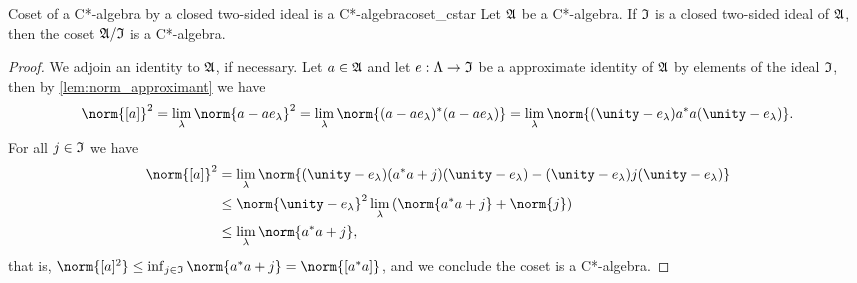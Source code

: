 \begin{theorem}{Coset of a C*-algebra by a closed two-sided ideal is a C*-algebra}{coset_cstar}
    Let \(\mathfrak{A}\) be a C*-algebra. If \(\mathfrak{I}\) is a closed two-sided ideal of \(\mathfrak{A}\), then the coset \(\mathfrak{A}/\mathfrak{I}\) is a C*-algebra.
\end{theorem}
\begin{proof}
    We adjoin an identity to \(\mathfrak{A}\), if necessary. Let \(a \in \mathfrak{A}\) and let \(e : \Lambda \to \mathfrak{I}\) be a approximate identity of \(\mathfrak{A}\) by elements of the ideal \(\mathfrak{I}\), then by \cref{lem:norm_approximant} we have
    \begin{equation*}
        \norm{[a]}^2 = \lim_{\lambda}{\norm{a - ae_{\lambda}}^2} = \lim_{\lambda}{\norm{(a - ae_{\lambda})^*(a - ae_{\lambda})}} = \lim_{\lambda}{\norm{(\unity - e_{\lambda})a^*a(\unity - e_{\lambda})}}.
    \end{equation*}
    For all \(j \in \mathfrak{I}\) we have
    \begin{align*}
        \norm{[a]}^2 &= \lim_{\lambda}{\norm{(\unity - e_{\lambda})(a^*a + j)(\unity - e_{\lambda}) - (\unity - e_{\lambda})j(\unity - e_{\lambda})}}\\
                     &\leq \norm{\unity - e_{\lambda}}^2\lim_{\lambda}{\left(\norm{a^*a + j} + \norm{j}\right)}\\
                     &\leq \lim_{\lambda}{\norm{a^*a + j}},
    \end{align*}
    that is, \(\norm{[a]^2} \leq \inf_{j \in \algebra{I}}{\norm{a^*a + j}} = \norm{[a^*a]}\), and we conclude the coset is a C*-algebra.
\end{proof}
